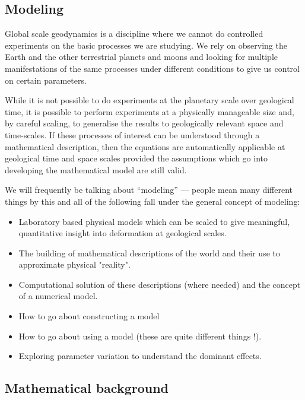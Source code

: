 \documentclass[10pt]{article}
\begin{document}

\subsection{Modeling}

Global scale geodynamics is a discipline where we cannot
do controlled experiments on the basic processes we are studying.
We rely on observing the Earth and the other terrestrial planets and moons and
looking for multiple manifestations of the same processes under different 
conditions to give us control on certain parameters. 

While it is not possible to do experiments at the planetary scale over geological time, it is 
possible to perform experiments at a physically manageable size and, by careful
scaling, to generalise the results to geologically relevant space and time-scales. 
If these processes of interest can be understood through a mathematical description, then
the equations are automatically applicable at geological time and space scales provided the 
assumptions which go into developing the mathematical model are still valid. 

We will frequently be talking about ``modeling'' --- people mean many different 
things by this and all of the following fall under the general concept of modeling:

\begin{itemize}
	\item Laboratory based physical models which can be scaled to 
		  give meaningful, quantitative insight into deformation at geological scales.
	\item The building of mathematical descriptions of the world
	      and their use to approximate physical "reality".
	\item Computational solution of these descriptions (where needed) and
	      the concept of a numerical model.
	\item How to go about constructing a model 
	\item How to go about using a model (these are quite different things !). 
	\item Exploring parameter variation to understand the dominant effects.
\end{itemize}


\subsection{Mathematical background}
\end{document}
